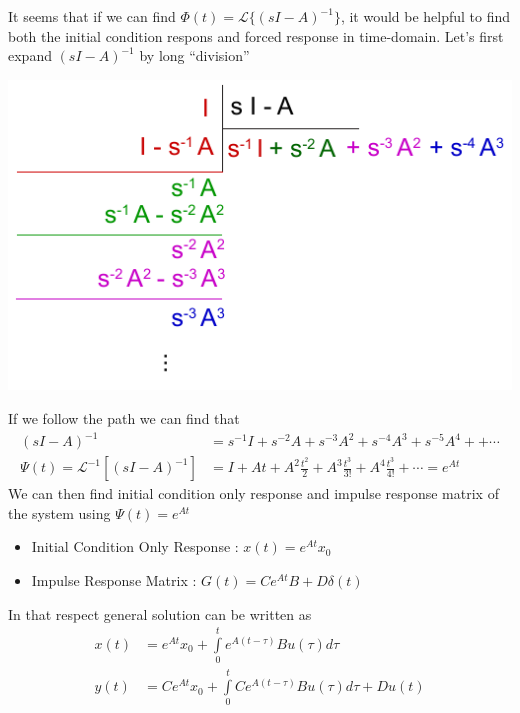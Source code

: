 \documentclass[twoside]{article}
\begin{document}
It seems that if we can find $\Phi(t) = \mathcal{L}\lbrace (sI - A)^{-1} \rbrace$, it would be helpful to
find both the initial condition respons and forced response in time-domain.
Let's first expand $\left( s I - A \right)^{-1}$ by long ``division'' 
%
     \begin{center}
 \begin{minipage}[h]{0.5\linewidth}
     \begin{center}
       \includegraphics[width=\textwidth]{s_directdivision}
     \end{center}
 \end{minipage}
     \end{center}
%
If we follow the path we can find that 
%
\begin{align*}
\left( s I - A \right)^{-1} &= s^{-1} I + s^{-2} A + s^{-3} A^2 +
                              s^{-4} A^3 +  s^{-5} A^4 + 
  + \cdots
\\
\Psi(t) = \mathcal{L}^{-1} \left[ \left( s I - A \right)^{-1} \right] &= I + A t
  + A^2 \frac{t^2}{2} + A^3 \frac{t^3}{3 !} + A^4 \frac{t^3}{4 !} + 
                                                              \cdots =
                                                                        e^{A t}
\end{align*}
%
We can then find initial condition only response and impulse response
matrix of the system using $\Psi(t) = e^{A t}$
%
\begin{itemize}
\item Initial Condition Only Response : $x(t) = e^{A t} x_0$
\item Impulse Response Matrix :  $ G(t) = C e^{A t} B + D \delta(t) $
\end{itemize}
%
In that respect general solution can be written as
%
\begin{align*}
  x(t) &= e^{A t} x_0 + \int\limits_{0}^{t} e^{A ( t - \tau ) } B u(\tau) d
                  \tau
\\
  y(t) &= C e^{A t} x_0 + \int\limits_{0}^{t} C e^{A ( t - \tau ) } B u(\tau) d
                  \tau + D u(t)
\end{align*}
\end{document}
